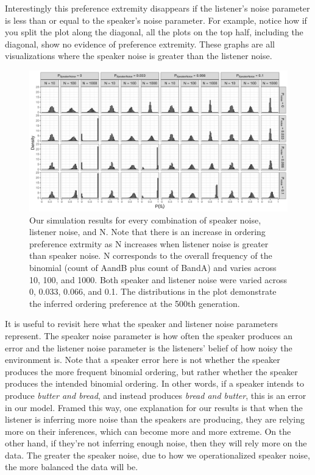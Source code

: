 \documentclass[10pt, letterpaper]{article}
\newenvironment{CodeChunk}{}{}
\begin{document}
Interestingly this preference extremity disappears if the listener's
noise parameter is less than or equal to the speaker's noise parameter.
For example, notice how if you split the plot along the diagonal, all
the plots on the top half, including the diagonal, show no evidence of
preference extremity. These graphs are all visualizations where the
speaker noise is greater than the listener noise.

\begin{CodeChunk}
\begin{figure}[!htb]
\includegraphics[width=1\linewidth]{Figures/full_plot_smallerN} \caption[Our simulation results for every combination of speaker noise, listener noise, and N]{Our simulation results for every combination of speaker noise, listener noise, and N. Note that there is an increase in ordering preference extrmity as N increases when listener noise is greater than speaker noise. N corresponds to the overall frequency of the binomial (count of AandB plus count of BandA) and varies across 10, 100, and 1000. Both speaker and listener noise were varied across 0, 0.033, 0.066, and 0.1. The distributions in the plot demonstrate the inferred ordering preference at the 500th generation.}\label{fig:fullsimsplot}
\end{figure}
\end{CodeChunk}

It is useful to revisit here what the speaker and listener noise
parameters represent. The speaker noise parameter is how often the
speaker produces an error and the listener noise parameter is the
listeners' belief of how noisy the environment is. Note that a speaker
error here is not whether the speaker produces the more frequent
binomial ordering, but rather whether the speaker produces the intended
binomial ordering. In other words, if a speaker intends to produce
\emph{butter and bread}, and instead produces \emph{bread and butter},
this is an error in our model. Framed this way, one explanation for our
results is that when the listener is inferring more noise than the
speakers are producing, they are relying more on their inferences, which
can become more and more extreme. On the other hand, if they're not
inferring enough noise, then they will rely more on the data. The
greater the speaker noise, due to how we operationalized speaker noise,
the more balanced the data will be.
\end{document}

